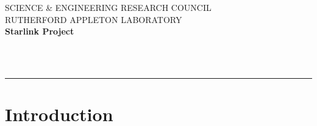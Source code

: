 \newcommand{\sstimplementationstatus}[1]{
   \item[{Implementation Status:}] \mbox{} \\[1.3ex] #1}

\newcommand{\sstbugs}[1]{\item[Bugs:] #1}

\newcommand{\sstitemlist}[1]{
  \mbox{} \\
  \vspace{-3.5ex}
  \begin{itemize}
     #1
  \end{itemize}
}

\newcommand{\sstitem}{\item}





\thispagestyle{empty}
SCIENCE \& ENGINEERING RESEARCH COUNCIL \hfill \stardocname\\
RUTHERFORD APPLETON LABORATORY\\
{\large\bf Starlink Project\\}
{\large\bf \stardoccategory\ \stardocnumber}
\begin{flushright}
\stardocauthors\\
\stardocdate
\end{flushright}
\vspace{-4mm}
\rule{\textwidth}{0.5mm}
\vspace{5mm}
\begin{center}
{\Large\bf \stardoctitle}
\end{center}
\vspace{5mm}

  \setlength{\parskip}{0mm}
  \tableofcontents
  \setlength{\parskip}{\medskipamount}
  \markright{\stardocname}

\newpage
\section{Introduction}

